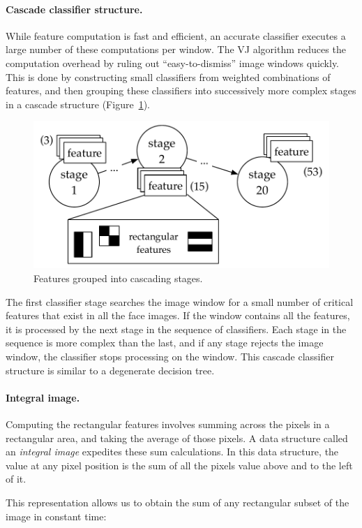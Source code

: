 \paragraph{Cascade classifier structure.} While feature computation is fast and efficient, an accurate classifier executes a large number of these computations per window. The VJ algorithm reduces the  computation overhead by ruling out ``easy-to-dismiss'' image windows quickly. This is done by constructing small classifiers from weighted combinations of features, and then grouping these classifiers into successively more complex stages in a cascade structure (Figure~\ref{fig:vj-cascade}).

\begin{figure}
  \centering
  \includegraphics[width=.6\textwidth]{nsp-figs/cascade_structure.pdf}
  \caption{Features grouped into cascading stages.}
  \label{fig:vj-cascade}
\end{figure}


The first classifier stage searches the image window for a small number of critical features that exist in all the face images. If the window contains all the features, it is processed by the next stage in the sequence of classifiers. Each stage in the sequence is more complex than the last, and if any stage rejects the image window, the classifier stops processing on the window. This cascade classifier structure is similar to a degenerate decision tree.

\paragraph{Integral image.}Computing the rectangular features involves summing across
the pixels in a rectangular area, and taking the average of those pixels.
A data structure called an \emph{integral image} expedites these sum calculations. In this
data structure, the value at any pixel position is the sum of all the pixels value above and
to the left of it.


This representation allows us to obtain the sum of any rectangular subset
of the image in constant time:

